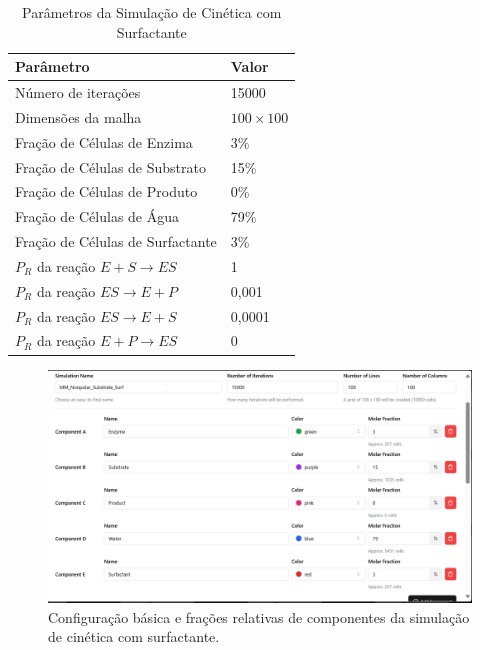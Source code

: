 \documentclass[12pt,oneside]{report}
\begin{document}
\begin{table}[H]
    \centering
    \caption{Parâmetros da Simulação de Cinética com Surfactante}
    \vspace{0.2cm}
    \begin{tabularx}{\textwidth}{X m{5cm}}
        \hline
        \textbf{Parâmetro}                     & \textbf{Valor}   \\
        \hline
        Número de iterações                    & 15000            \\
        Dimensões da malha                     & $100 \times 100$ \\
        Fração de Células de Enzima            & 3\%              \\
        Fração de Células de Substrato         & 15\%             \\
        Fração de Células de Produto           & 0\%              \\
        Fração de Células de Água              & 79\%             \\
        Fração de Células de Surfactante       & 3\%              \\
        $P_R$ da reação $E + S \rightarrow ES$ & 1                \\
        $P_R$ da reação $ES \rightarrow E + P$ & 0{,}001          \\
        $P_R$ da reação $ES \rightarrow E + S$ & 0{,}0001         \\
        $P_R$ da reação $E + P \rightarrow ES$ & 0                \\
        \hline
    \end{tabularx}
    \vspace{0.2cm}
    \label{tab:params_apolar_surfactante}
\end{table}

\begin{figure}[H]
    \centering
    \includegraphics[width=1\textwidth]{MM_surf.png}
    \caption{\small Configuração básica e frações relativas de componentes da simulação de cinética com surfactante.}
    \label{fig:apolar_surfactante}
\end{figure}
\end{document}
